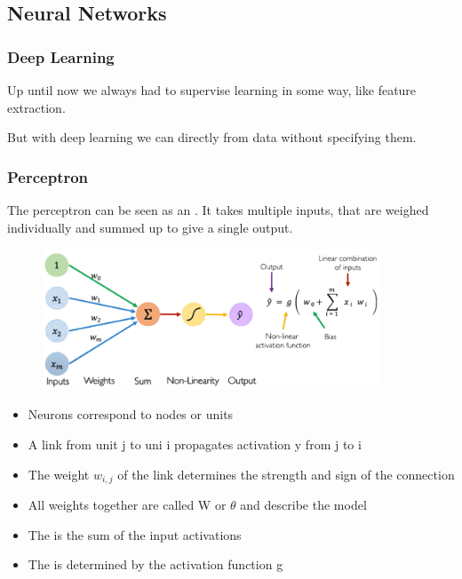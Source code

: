 \documentclass[
../../EiKI_Summary.tex,
]
{subfiles}
\begin{document}
\newpage
\subsection{Neural Networks}
\subsubsection{Deep Learning}
Up until now we always had to supervise learning in some way, like feature extraction. 

But with deep learning we can  directly from data without specifying them.

\subsubsection{Perceptron}
The perceptron can be seen as an . It takes multiple inputs, that are weighed individually and summed up to give a single output.

\begin{figure}
    [H]
    \centering
    \includegraphics[width=0.9\textwidth]{Pics/11/Perceptron.png}
\end{figure}

\begin{itemize}
    \item Neurons correspond to nodes or units
    \item A link from unit j to uni i propagates activation y from j to i
    \item The weight $w_{i,j}$ of the link determines the strength and sign of the connection
    \item All weights together are called W or $\theta$ and describe the model
    \item The  is the sum of the input activations
    \item The  is determined by the activation function g
\end{itemize}
\end{document}
